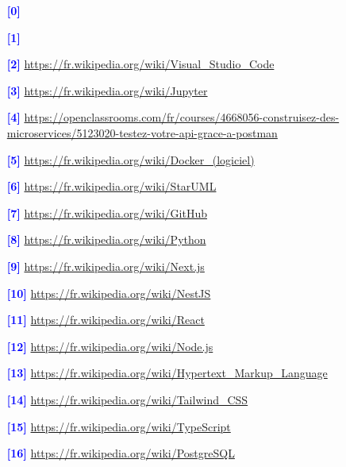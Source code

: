 \documentclass[a4paper,12pt]{report}
\begin{document}
\begin{itemize}
    \item[\textcolor{blue}{\textbf{[0]}}] \texttt{}
    \item[\textcolor{blue}{\textbf{[1]}}] \texttt{}
    \item[\textcolor{blue}{\textbf{[2]}}] \url{https://fr.wikipedia.org/wiki/Visual_Studio_Code}
    \item[\textcolor{blue}{\textbf{[3]}}] \url{https://fr.wikipedia.org/wiki/Jupyter}
    \item[\textcolor{blue}{\textbf{[4]}}] \url{https://openclassrooms.com/fr/courses/4668056-construisez-des-microservices/5123020-testez-votre-api-grace-a-postman}
    \item[\textcolor{blue}{\textbf{[5]}}] \url{https://fr.wikipedia.org/wiki/Docker_(logiciel)}
    \item[\textcolor{blue}{\textbf{[6]}}] \url{https://fr.wikipedia.org/wiki/StarUML}
    \item[\textcolor{blue}{\textbf{[7]}}] \url{https://fr.wikipedia.org/wiki/GitHub}
    \item[\textcolor{blue}{\textbf{[8]}}] \url{https://fr.wikipedia.org/wiki/Python}
    \item[\textcolor{blue}{\textbf{[9]}}] \url{https://fr.wikipedia.org/wiki/Next.js}
    \item[\textcolor{blue}{\textbf{[10]}}] \url{https://fr.wikipedia.org/wiki/NestJS}
    \item[\textcolor{blue}{\textbf{[11]}}] \url{https://fr.wikipedia.org/wiki/React}
    \item[\textcolor{blue}{\textbf{[12]}}] \url{https://fr.wikipedia.org/wiki/Node.js}
    \item[\textcolor{blue}{\textbf{[13]}}] \url{https://fr.wikipedia.org/wiki/Hypertext_Markup_Language}
    \item[\textcolor{blue}{\textbf{[14]}}] \url{https://fr.wikipedia.org/wiki/Tailwind_CSS}
    \item[\textcolor{blue}{\textbf{[15]}}] \url{https://fr.wikipedia.org/wiki/TypeScript}
    \item[\textcolor{blue}{\textbf{[16]}}] \url{https://fr.wikipedia.org/wiki/PostgreSQL}
\end{itemize}
\end{document}
